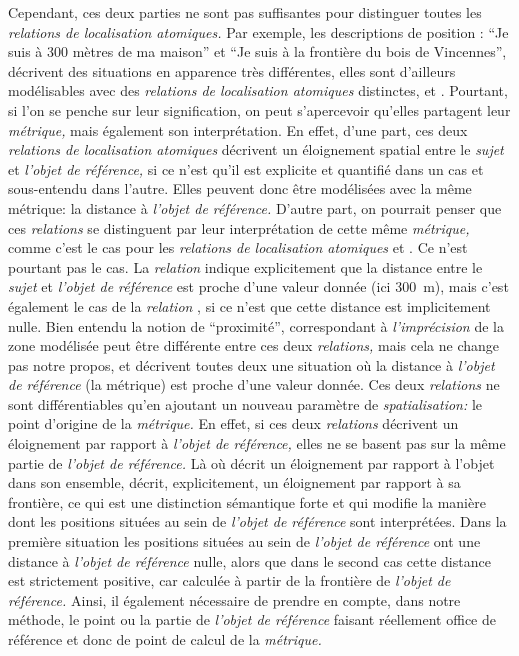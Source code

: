 Cependant, ces deux parties ne sont pas suffisantes pour distinguer
toutes les \emph{relations de localisation atomiques.} Par exemple,
les descriptions de position : \enquote{Je suis à 300 mètres de ma
  maison} et \enquote{Je suis à la frontière du bois de Vincennes},
décrivent des situations en apparence très différentes, elles sont
d'ailleurs modélisables avec des \emph{relations de localisation
  atomiques} distinctes,  et
. Pourtant, si l'on se penche sur
leur signification, on peut s’apercevoir qu'elles partagent leur
\emph{métrique,} mais également son interprétation. En effet, d'une
part, ces deux \emph{relations de localisation atomiques} décrivent un
éloignement spatial entre le \emph{sujet} et \emph{l'objet de
  référence,} si ce n'est qu'il est explicite et quantifié dans un cas
et sous-entendu dans l'autre. Elles peuvent donc être modélisées avec
la même métrique: la distance à \emph{l'objet de référence.} D'autre
part, on pourrait penser que ces \emph{relations} se distinguent par
leur interprétation de cette même \emph{métrique,} comme c'est le cas
pour les \emph{relations de localisation atomiques}
 et . Ce n'est pourtant
pas le cas. La \emph{relation} 
indique explicitement que la distance entre le \emph{sujet} et
\emph{l'objet de référence} est proche d'une valeur donnée (ici
\SI{300}{\meter}), mais c'est également le cas de la \emph{relation}
, si ce n'est que cette distance est
implicitement nulle. Bien entendu la notion de \enquote{proximité},
correspondant à \emph{l'imprécision} de la zone modélisée peut être
différente entre ces deux \emph{relations,} mais cela ne change pas
notre propos,  et
 décrivent toutes deux une situation
où la distance à \emph{l'objet de référence} (\ie la métrique) est
proche d'une valeur donnée. Ces deux \emph{relations} ne sont
différentiables qu'en ajoutant un nouveau paramètre de
\emph{spatialisation:} le point d'origine de la \emph{métrique.} En
effet, si ces deux \emph{relations} décrivent un éloignement par
rapport à \emph{l'objet de référence,} elles ne se basent pas sur la
même partie de \emph{l'objet de référence.} Là où
 décrit un éloignement par rapport à
l'objet dans son ensemble,  décrit,
explicitement, un éloignement par rapport à sa frontière, ce qui est
une distinction sémantique forte et qui modifie la manière dont les
positions situées au sein de \emph{l'objet de référence} sont
interprétées. Dans la première situation les positions situées au sein
de \emph{l'objet de référence} ont une distance à \emph{l'objet de
  référence} nulle, alors que dans le second cas cette distance est
strictement positive, car calculée à partir de la frontière de
\emph{l'objet de référence.} Ainsi, il également nécessaire de prendre
en compte, dans notre méthode, le point ou la partie de \emph{l'objet
  de référence} faisant réellement office de référence et donc de
point de calcul de la \emph{métrique.}

